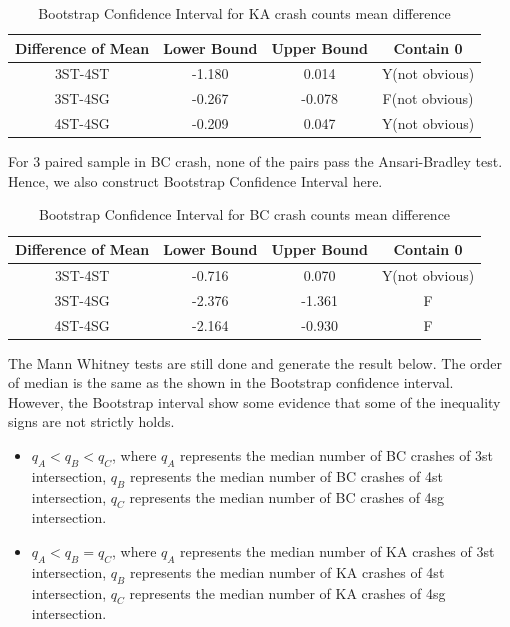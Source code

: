 \documentclass[11pt]{scrartcl} %
\begin{document}
\begin{table}[H]
\caption{Bootstrap Confidence Interval for KA crash counts mean difference}
\centering
\begin{tabular}{|c|c|c|c|}
\hline
Difference of Mean  & Lower Bound & Upper Bound & Contain 0 \\
\hline
3ST-4ST & -1.180 & 0.014 & Y(not obvious) \\
\hline
3ST-4SG   & -0.267  & -0.078  & F(not obvious) \\
\hline
4ST-4SG   & -0.209  & 0.047 & Y(not obvious) \\
\hline
\end{tabular}
\end{table}

For 3 paired sample in BC crash, none of the pairs pass the Ansari-Bradley test. Hence, we also construct Bootstrap Confidence Interval here.

\begin{table}[H]
\caption{Bootstrap Confidence Interval for BC crash counts mean difference}
\centering
\begin{tabular}{|c|c|c|c|}
\hline
Difference of Mean  & Lower Bound & Upper Bound & Contain 0 \\
\hline
3ST-4ST & -0.716 & 0.070 & Y(not obvious) \\
\hline
3ST-4SG   & -2.376  & -1.361  & F \\
\hline
4ST-4SG   & -2.164  & -0.930 & F \\
\hline
\end{tabular}
\end{table}

The Mann Whitney tests are still done and generate the result below. The order of median is the same as the shown in the Bootstrap confidence interval. However, the Bootstrap interval show some evidence that some of the inequality signs are not strictly holds.

\begin{itemize}
	\item ${q_A} < {q_B} < {q_C}$, where $q_A$ represents the median number of BC crashes of 3st intersection, $q_B$ represents the median number of BC crashes of 4st intersection, $q_C$ represents the median number of BC crashes of 4sg intersection.
	\item ${q_A} < {q_B} = {q_C}$, where $q_A$ represents the median number of KA crashes of 3st intersection, $q_B$ represents the median number of KA crashes of 4st intersection, $q_C$ represents the median number of KA crashes of 4sg intersection.
\end{itemize}
\end{document}

